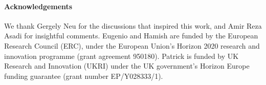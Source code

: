 \documentclass[3p, authoryear, 10pt]{elsarticle}%
\begin{document}
\paragraph{Acknowledgements} 
We thank Gergely Neu for the discussions that inspired this work, and Amir Reza Asadi for insightful comments. Eugenio and Hamish are funded by the European Research Council (ERC), under the European Union’s Horizon 2020 research and innovation programme (grant agreement 950180). Patrick is funded by UK Research and Innovation (UKRI) under the UK government’s Horizon Europe funding guarantee (grant number EP/Y028333/1).


\end{document}
